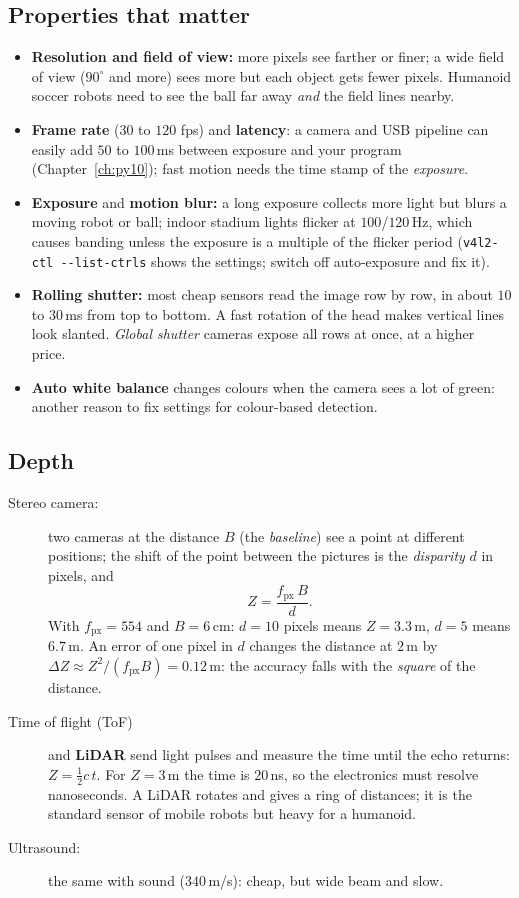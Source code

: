 \subsection*{Properties that matter}
\begin{itemize}[nosep]
  \item \textbf{Resolution and field of view:} more pixels see farther or finer; a wide field of view ($90^\circ$ and more) sees more but each object gets fewer pixels. Humanoid soccer robots need to see the ball far away \emph{and} the field lines nearby.
  \item \textbf{Frame rate} ($30$ to $120$ fps) and \textbf{latency}: a camera and USB pipeline can easily add $50$ to $100$\,ms between exposure and your program (Chapter~\ref{ch:py10}); fast motion needs the time stamp of the \emph{exposure}.
  \item \textbf{Exposure} and \textbf{motion blur:} a long exposure collects more light but blurs a moving robot or ball; indoor stadium lights flicker at $100$/$120$\,Hz, which causes banding unless the exposure is a multiple of the flicker period (\verb!v4l2-ctl --list-ctrls! shows the settings; switch off auto-exposure and fix it).
  \item \textbf{Rolling shutter:} most cheap sensors read the image row by row, in about $10$ to $30$\,ms from top to bottom. A fast rotation of the head makes vertical lines look slanted. \emph{Global shutter} cameras expose all rows at once, at a higher price.
  \item \textbf{Auto white balance} changes colours when the camera sees a lot of green: another reason to fix settings for colour-based detection.
\end{itemize}

\subsection*{Depth}
\begin{description}
  \item[Stereo camera:] two cameras at the distance $B$ (the \emph{baseline}) see a point at different positions; the shift of the point between the pictures is the \emph{disparity} $d$ in pixels, and
  \[Z=\frac{f_\text{px}\,B}{d}.\]
  With $f_\text{px}=554$ and $B=6$\,cm: $d=10$ pixels means $Z=3.3$\,m, $d=5$ means $6.7$\,m. An error of one pixel in $d$ changes the distance at $2$\,m by $\Delta Z\approx Z^2/(f_\text{px}B)=0.12$\,m: the accuracy falls with the \emph{square} of the distance.
  \item[Time of flight (ToF)] and \textbf{LiDAR} send light pulses and measure the time until the echo returns: $Z=\tfrac12 c\,t$. For $Z=3$\,m the time is $20$\,ns, so the electronics must resolve nanoseconds. A LiDAR rotates and gives a ring of distances; it is the standard sensor of mobile robots but heavy for a humanoid.
  \item[Ultrasound:] the same with sound ($340$\,m/s): cheap, but wide beam and slow.
\end{description}

